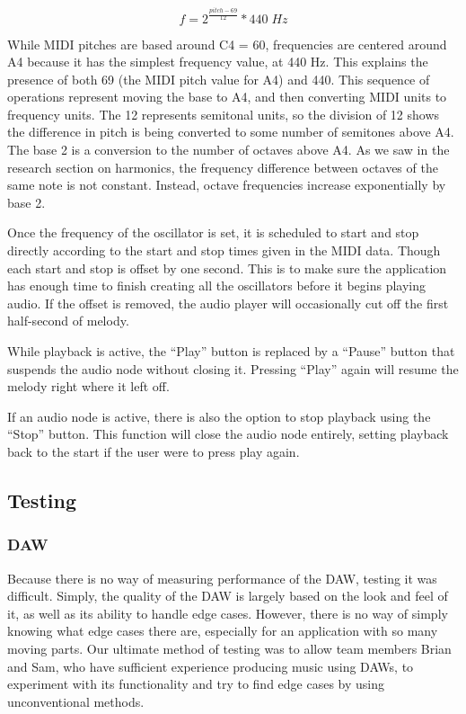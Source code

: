 \begin{equation} \label{get_frequency}
  f = 2^{\frac{pitch - 69}{12}} * 440 \;Hz
\end{equation}

While MIDI pitches are based around C4 = 60, frequencies are centered around A4 because it has the
simplest frequency value, at 440 Hz. This explains the presence of both 69 (the MIDI pitch value
for A4) and 440. This sequence of operations represent moving the base to A4, and then converting
MIDI units to frequency units. The 12 represents semitonal units, so the division of 12 shows the
difference in pitch is being converted to some number of semitones above A4. The base 2 is a
conversion to the number of octaves above A4. As we saw in the research section on harmonics, the
frequency difference between octaves of the same note is not constant. Instead, octave frequencies
increase exponentially by base 2.

Once the frequency of the oscillator is set, it is scheduled to start and stop directly according
to the start and stop times given in the MIDI data. Though each start and stop is offset by one
second. This is to make sure the application has enough time to finish creating all the oscillators
before it begins playing audio. If the offset is removed, the audio player will occasionally cut
off the first half-second of melody.

While playback is active, the “Play” button is replaced by a “Pause” button that suspends the audio
node without closing it. Pressing “Play” again will resume the melody right where it left off.

If an audio node is active, there is also the option to stop playback using the “Stop” button. This
function will close the audio node entirely, setting playback back to the start if the user were to
press play again.

\subsection{Testing}

\subsubsection{DAW}

Because there is no way of measuring performance of the DAW, testing it was difficult. Simply, the
quality of the DAW is largely based on the look and feel of it, as well as its ability to handle
edge cases. However, there is no way of simply knowing what edge cases there are, especially for
an application with so many moving parts. Our ultimate method of testing was to allow team members
Brian and Sam, who have sufficient experience producing music using DAWs, to experiment with its
functionality and try to find edge cases by using unconventional methods.

